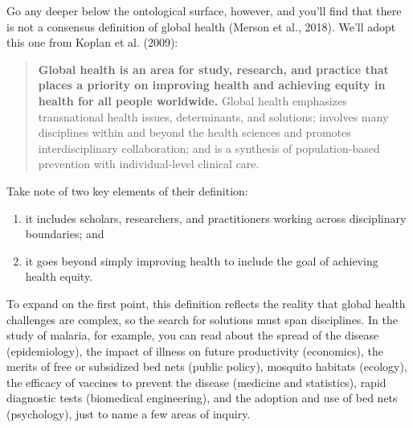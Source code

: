 \documentclass[
  letterpaper,
  DIV=11,
  numbers=noendperiod,
  oneside]{scrreprt}
\providecommand{\tightlist}{%
  \setlength{\itemsep}{0pt}\setlength{\parskip}{0pt}}\usepackage{longtable,booktabs,array}
\begin{document}
Go any deeper below the ontological surface, however, and you'll find
that there is not a consensus definition of global health (Merson et
al.,
2018).
We'll adopt this one from Koplan et al.
(2009):

\begin{quote}
\textbf{Global health is an area for study, research, and practice that
places a priority on improving health and achieving equity in health for
all people worldwide.} Global health emphasizes transnational health
issues, determinants, and solutions; involves many disciplines within
and beyond the health sciences and promotes interdisciplinary
collaboration; and is a synthesis of population-based prevention with
individual-level clinical care.
\end{quote}

Take note of two key elements of their definition:

\begin{enumerate}
\def\labelenumi{\arabic{enumi}.}
\tightlist
\item
  it includes scholars, researchers, and practitioners working across
  disciplinary boundaries; and
\item
  it goes beyond simply improving health to include the goal of
  achieving health equity.
\end{enumerate}

To expand on the first point, this definition reflects the reality that
global health challenges are complex, so the search for solutions must
span disciplines. In the study of malaria, for example, you can read
about the spread of the disease (epidemiology), the impact of illness on
future productivity (economics), the merits of free or subsidized bed
nets (public policy), mosquito habitats (ecology), the efficacy of
vaccines to prevent the disease (medicine and statistics), rapid
diagnostic tests (biomedical engineering), and the adoption and use of
bed nets (psychology), just to name a few areas of inquiry.
\end{document}
